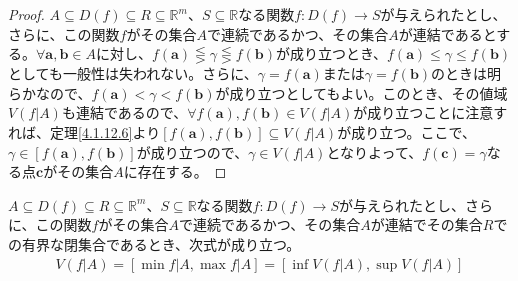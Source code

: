 \documentclass[dvipdfmx]{jsarticle}
\begin{document}
\begin{proof}
$A \subseteq D(f) \subseteq R \subseteq \mathbb{R}^{m}$、$S \subseteq \mathbb{R}$なる関数$f:D(f) \rightarrow S$が与えられたとし、さらに、この関数$f$がその集合$A$で連続であるかつ、その集合$A$が連結であるとする。$\forall\mathbf{a},\mathbf{b} \in A$に対し、$f\left( \mathbf{a} \right) \lesseqgtr \gamma \lesseqgtr f\left( \mathbf{b} \right)$が成り立つとき、$f\left( \mathbf{a} \right) \leq \gamma \leq f\left( \mathbf{b} \right)$としても一般性は失われない。さらに、$\gamma = f\left( \mathbf{a} \right)$または$\gamma = f\left( \mathbf{b} \right)$のときは明らかなので、$f\left( \mathbf{a} \right) < \gamma < f\left( \mathbf{b} \right)$が成り立つとしてもよい。このとき、その値域$V\left( f|A \right)$も連結であるので、$\forall f\left( \mathbf{a} \right),f\left( \mathbf{b} \right) \in V\left( f|A \right)$が成り立つことに注意すれば、定理\ref{4.1.12.6}より$\left[ f\left( \mathbf{a} \right),f\left( \mathbf{b} \right) \right] \subseteq V\left( f|A \right)$が成り立つ。ここで、$\gamma \in \left[ f\left( \mathbf{a} \right),f\left( \mathbf{b} \right) \right]$が成り立つので、$\gamma \in V\left( f|A \right)$となりよって、$f\left( \mathbf{c} \right) = \gamma$なる点$\mathbf{c}$がその集合$A$に存在する。
\end{proof}
\begin{thm}\label{4.1.12.8}
$A \subseteq D(f) \subseteq R \subseteq \mathbb{R}^{m}$、$S \subseteq \mathbb{R}$なる関数$f:D(f) \rightarrow S$が与えられたとし、さらに、この関数$f$がその集合$A$で連続であるかつ、その集合$A$が連結でその集合$R$での有界な閉集合であるとき、次式が成り立つ。
\begin{align*}
V\left( f|A \right) = \left[ \min{f|A},\max{f|A} \right] = \left[ \inf{V\left( f|A \right)},\sup{V\left( f|A \right)} \right]
\end{align*}
\end{thm}
\end{document}
